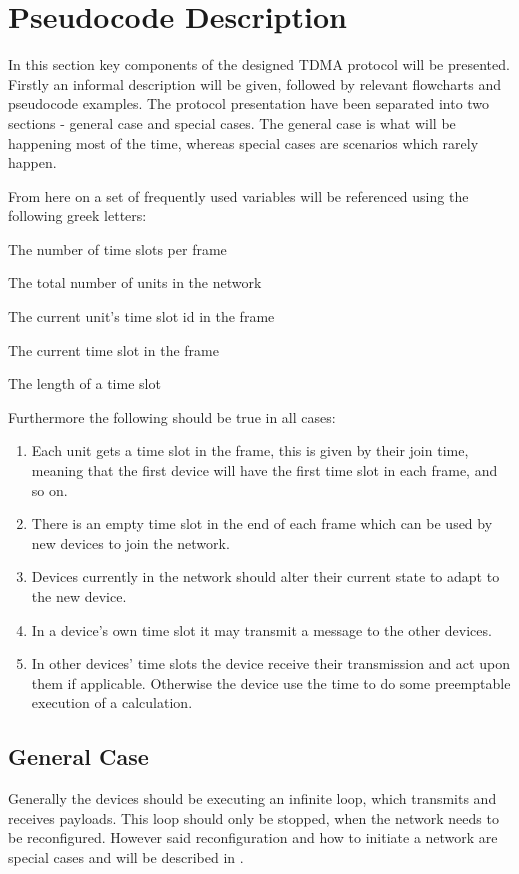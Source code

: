 \section{Pseudocode Description}
In this section key components of the designed TDMA protocol will be presented.
Firstly an informal description will be given, followed by relevant flowcharts and pseudocode examples.
The protocol presentation have been separated into two sections - general case and special cases. 
The general case is what will be happening most of the time, whereas special cases are scenarios which rarely happen. 

From here on a set of frequently used variables will be referenced using the following greek letters: 
\begin{description}[labelindent=\parindent]
    \item[$\alpha$] The number of time slots per frame
    \item[$\beta$] The total number of units in the network
    \item[$\kappa$] The current unit's time slot id in the frame
    \item[$\lambda$] The current time slot in the frame
    \item[$\rho$] The length of a time slot
\end{description}  
\noindent
Furthermore the following should be true in all cases: 
\begin{enumerate}[label=\itshape \alph*\upshape)]
    \item Each unit gets a time slot in the frame, this is given by their join time, meaning that the first device will have the first time slot in each frame, and so on.
    \item There is an empty time slot in the end of each frame which can be used by new devices to join the network.
    \item Devices currently in the network should alter their current state to adapt to the new device.
    \item In a device's own time slot it may transmit a message to the other devices.
    \item In other devices' time slots the device receive their transmission and act upon them if applicable. Otherwise the device use the time to do some preemptable execution of a calculation.
\end{enumerate}
                    
\subsection{General Case} %
\label{sub:general_case}
Generally the devices should be executing an infinite loop, which transmits and receives payloads.
This loop should only be stopped, when the network needs to be reconfigured.
However said reconfiguration and how to initiate a network are special cases and will be described in .

